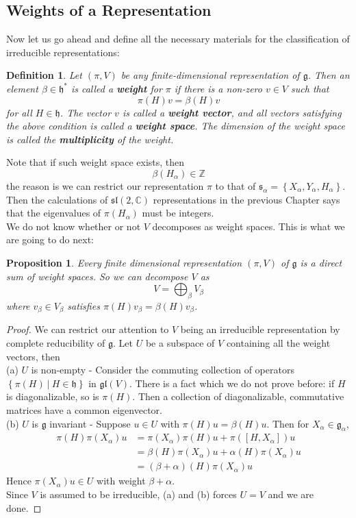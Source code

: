 \documentclass[11pt]{article}
\newtheorem{proposition}[theorem]{Proposition}
\newtheorem{definition}[theorem]{Definition}
\newcommand{\bb}[1]{\mathbb{#1}}
\newcommand{\mf}[1]{\mathfrak{#1}}
\begin{document}
\subsection{Weights of a Representation}
Now let us go ahead and define all the necessary materials for the classification of irreducible representations:
\begin{definition} \label{defweight}
Let $(\pi,V)$ be any finite-dimensional representation of $\mf{g}$. Then an element $\beta \in \mf{h}^*$ is called a \textbf{weight} for $\pi$ if there is a non-zero $v \in V$ such that
$$\pi(H)v = \beta(H)v$$
for all $H \in \mf{h}$. The vector $v$ is called a \textbf{weight vector}, and all vectors satisfying the above condition is called a \textbf{weight space}. The dimension of the weight space is called the \textbf{multiplicity} of the weight.
\end{definition}
Note that if such weight space exists, then
$$\beta(H_{\alpha}) \in \bb{Z}$$
the reason is we can restrict our representation $\pi$ to that of $\mf{s}_{\alpha} = \left\{X_{\alpha}, Y_{\alpha}, H_{\alpha}\right\}$. Then the calculations of $\mf{sl}(2,\bb{C})$ representations in the previous Chapter says that the eigenvalues of $\pi(H_{\alpha})$ must be integers.\\
We do not know whether or not $V$ decomposes as weight spaces. This is what we are going to do next:
\begin{proposition}
Every finite dimensional representation $(\pi,V)$ of $\mf{g}$ is a direct sum of weight spaces. So we can decompose $V$ as
$$V = \bigoplus_{\beta} V_{\beta}$$
where $v_{\beta} \in V_{\beta}$ satisfies $\pi(H)v_{\beta} = \beta(H)v_{\beta}$.
\end{proposition}
\begin{proof}
We can restrict our attention to $V$ being an irreducible representation by complete reducibility of $\mf{g}$. Let $U$ be a subspace of $V$ containing all the weight vectors, then\\
(a) $U$ is non-empty - Consider the commuting collection of operators $\left\{\pi(H)\ \Big|\ H \in \mf{h}\right\}$ in $\mf{gl}(V)$. There is a fact which we do not prove before: if $H$ is diagonalizable, so is $\pi(H)$. Then a collection of diagonalizable, commutative matrices have a common eigenvector.\\
(b) $U$ is $\mf{g}$ invariant - Suppose $u \in U$ with $\pi(H)u = \beta(H)u$. Then for $X_{\alpha} \in \mf{g}_{\alpha}$,
\begin{align*}
\pi(H)\pi(X_{\alpha})u &= \pi(X_{\alpha})\pi(H)u + \pi([H,X_{\alpha}])u\\
&= \beta(H)\pi(X_{\alpha})u+ \alpha(H)\pi(X_{\alpha})u\\
&= (\beta + \alpha)(H)\pi(X_{\alpha})u
\end{align*}
Hence $\pi(X_{\alpha})u \in U$ with weight $\beta + \alpha$.\\
Since $V$ is assumed to be irreducible, (a) and (b) forces $U = V$ and we are done.
\end{proof}
\end{document}
